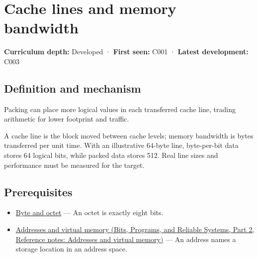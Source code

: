 \hypertarget{appendix-e4ccdbab8320}{}\label{referencestart:appendix-e4ccdbab8320}
\section{Cache lines and memory bandwidth}\label{appendix-e4ccdbab8320-cache-lines-and-memory-bandwidth}

\hypertarget{appendix-e4ccdbab8320-cache-lines-and-memory-bandwidth}{}

\textbf{Curriculum depth:} Developed · \textbf{First seen:} C001 · \textbf{Latest development:} C003

\begin{allmightroledefinition}

\subsection{Definition and mechanism}\label{appendix-e4ccdbab8320-definition-and-mechanism}

\hypertarget{appendix-e4ccdbab8320-definition-and-mechanism}{}

Packing can place more logical values in each transferred cache line, trading arithmetic for lower footprint and traffic.

\end{allmightroledefinition}

A cache line is the block moved between cache levels; memory bandwidth is bytes transferred per unit time. With an illustrative 64-byte line, byte-per-bit data stores 64 logical bits, while packed data stores 512. Real line sizes and performance must be measured for the target.

\subsection{Prerequisites}\label{appendix-e4ccdbab8320-prerequisites}

\hypertarget{appendix-e4ccdbab8320-prerequisites}{}

\begin{itemize}
\tightlist
\item
  \hyperref[appendix-5bee2df85484]{Byte and octet} --- An octet is exactly eight bits.
\item
  \href{../01-Bits-Programs-and-Reliable-Systems-P02/main.pdf\#appendix-18ee4f913c3c}{Addresses and virtual memory (Bits, Programs, and Reliable Systems, Part 2, Reference notes: Addresses and virtual memory)} --- An address names a storage location in an address space.
\end{itemize}

